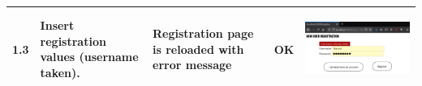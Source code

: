 \documentclass[12pt,twoside,titlepage,a4paper]{article}
\theoremstyle{definicion}
\theoremstyle{lema}
\theoremstyle{teorema}
\theoremstyle{corolario}
\theoremstyle{ejemplo}
\theoremstyle{nota}
\begin{document}
\begin{table}[!h]
\begin{tabular}{|m{0.6cm}|m{3cm}|m{3.6cm}|m{1.1cm}|m{5.9cm}|}
		\hline
		1.3 & Insert registration values (username taken). & Registration page is reloaded with error message & OK &
		\begin{center}\includegraphics[scale=0.28]{register3.png}\end{center} \\
		\hline
	\end{tabular}
\end{table}
\newpage
\end{document}
